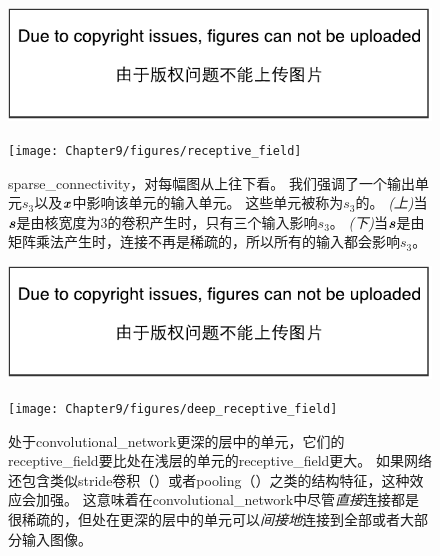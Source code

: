 \begin{figure}[!htb]
\ifOpenSource
\centerline{\includegraphics{figure.pdf}}
\else
\centerline{\texttt{[image: Chapter9/figures/receptive\_field]}}
\fi
\captionsetup{singlelinecheck=off}
\caption[Caption for LOF]{\gls{sparse_connectivity}，对每幅图从上往下看。
我们强调了一个输出单元$s_3$以及$\boldsymbol{\mathit{x}}$中影响该单元的输入单元。
这些单元被称为$s_3$的\protect\footnotemark。
\emph{(上)}当$\boldsymbol{\mathit{s}}$是由核宽度为3的卷积产生时，只有三个输入影响$s_3$。
\emph{(下)}当$\boldsymbol{\mathit{s}}$是由矩阵乘法产生时，连接不再是稀疏的，所以所有的输入都会影响$s_3$。}
\label{fig:chap9_receptive_field}
\end{figure}

\begin{figure}[!htb]
\ifOpenSource
\centerline{\includegraphics{figure.pdf}}
\else
\centerline{\texttt{[image: Chapter9/figures/deep\_receptive\_field]}}
\fi
\caption{处于\gls{convolutional_network}更深的层中的单元，它们的\gls{receptive_field}要比处在浅层的单元的\gls{receptive_field}更大。
如果网络还包含类似\gls{stride}卷积（）或者\gls{pooling}（）之类的结构特征，这种效应会加强。
这意味着在\gls{convolutional_network}中尽管\emph{直接}连接都是很稀疏的，但处在更深的层中的单元可以\emph{间接地}连接到全部或者大部分输入图像。}
\label{fig:chap9_deep_receptive_field}
\end{figure}

 
